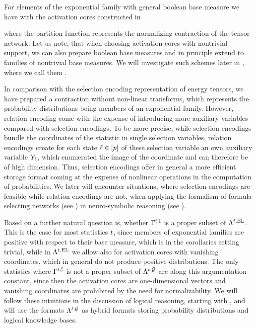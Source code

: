 For elements of the exponential family with general boolean base measure we have with the activation cores constructed in 
\begin{center}
     
\end{center}
where the partition function represents the normalizing contraction of the tensor network.
Let us note, that when choosing activation cores with nontrivial support, we can also prepare boolean base measures and in principle extend  to families of nontrivial base measures.
We will investigate such schemes later in , where we call them \HybridLogicNetworks{}.

In comparison with the selection encoding representation of energy tensors, we have prepared a contraction without non-linear transforms, which represents the probability distributions being members of an exponential family.
However, relation encoding come with the expense of introducing more auxiliary variables compared with selection encodings.
To be more precise, while selection encodings bundle the coordinates of the statistic in single selection variables, relation encodings create for each state $\ell\in[p]$ of these selection variable an own auxiliary variable $Y_{\ell}$, which enumerated the image of the coordinate and can therefore be of high dimension.
Thus, selection encodings offer in general a more efficient storage format coming at the expense of nonlinear operations in the computation of probabilities.
We later will encounter situations, where selection encodings are feasible while relation encodings are not, when applying the formalism of formula selecting networks (see ) in neuro-symbolic reasoning (see ).


Based on  a further natural question is, whether $\Gamma^{t,\mathbb{I}}$ is a proper subset of $\Lambda^{t,\mathrm{EL}}$.
This is the case for most statistics $t$, since members of exponential families are positive with respect to their base measure, which is in the corollaries setting trivial, while in $\Lambda^{t,\mathrm{EL}}$ we allow also for activation cores with vanishing coordinates, which in general do not produce positive distributions.
The only statistics where $\Gamma^{t,\mathbb{I}}$ is not a proper subset of $\Lambda^{t,\mathcal{G}}$ are along this argumentation constant, since then the activation cores are one-dimensional vectors and vanishing coordinates are prohibited by the need for normalizability.
We will follow these intuitions in the discussion of logical reasoning, starting with , and will use the formats $\Lambda^{t,\mathcal{G}}$ as hybrid formats storing probability distributions and logical knowledge bases.

